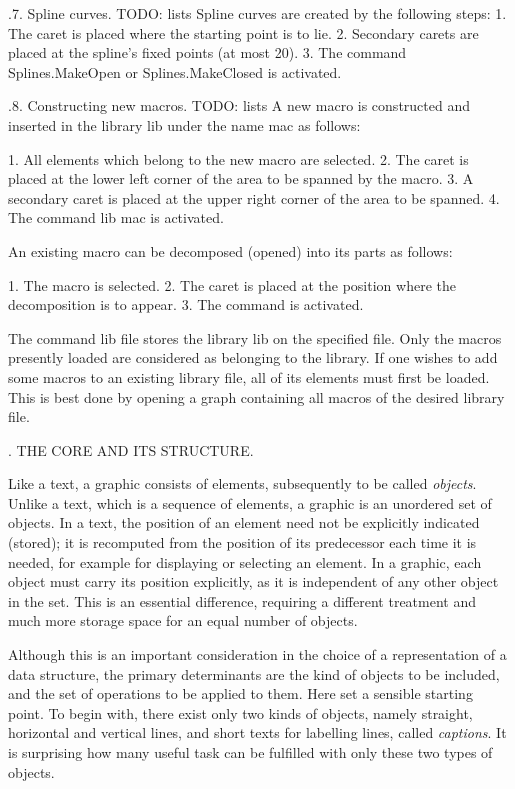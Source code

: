 .7. Spline curves.
TODO: lists
Spline curves are created by the following steps:
1. The caret is placed where the starting point is to lie.
2. Secondary carets are placed at the spline's fixed points (at most 20).
3. The command Splines.MakeOpen or Splines.MakeClosed is activated.

.8. Constructing new macros.
TODO: lists
A new macro is constructed and inserted in the library lib under the name mac as follows:

1. All elements which belong to the new macro are selected.
2. The caret is placed at the lower left corner of the area to be spanned by the macro.
3. A secondary caret is placed at the upper right corner of the area to be spanned.
4. The command  lib mac is activated.

An existing macro can be decomposed (opened) into its parts as follows:

1. The macro is selected.
2. The caret is placed at the position where the decomposition is to appear.
3. The command  is activated.

The command  lib file stores the library lib on the specified file. Only the macros presently loaded are considered as belonging to the library. If one wishes to add some macros to an existing library file, all of its elements must first be loaded. This is best done by opening a graph containing all macros of the desired library file.

. THE CORE AND ITS STRUCTURE.

Like a text, a graphic consists of elements, subsequently to be called \emph{objects}. Unlike a text, which is a sequence of elements, a graphic is an unordered set of objects. In a text, the position of an element need not be explicitly indicated (stored); it is recomputed from the position of its predecessor each time it is needed, for example for displaying or selecting an element. In a graphic, each object must carry its position explicitly, as it is independent of any other object in the set. This is an essential difference, requiring a different treatment and much more storage space for an equal number of objects.

Although this is an important consideration in the choice of a representation of a data structure, the primary determinants are the kind of objects to be included, and the set of operations to be applied to them. Here  set a sensible starting point. To begin with, there exist only two kinds of objects, namely straight, horizontal and vertical lines, and short texts for labelling lines, called \emph{captions}. It is surprising how many useful task can be fulfilled with only these two types of objects.

